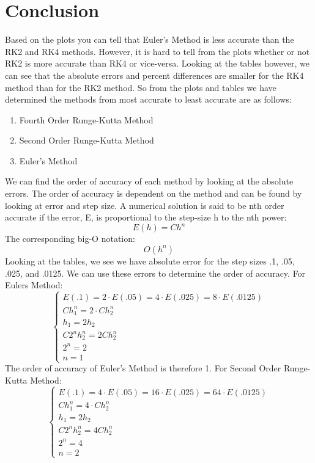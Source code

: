 \documentclass[12pt]{article}
\begin{document}
\section{Conclusion}\label{sec::conclusion}
Based on the plots you can tell that Euler's Method is less accurate than the RK2 and RK4 methods. However, it is hard to tell from the plots whether or not RK2 is more accurate than RK4 or vice-versa. Looking at the tables however, we can see that the absolute errors and percent differences are smaller for the RK4 method than for the RK2 method. So from the plots and tables we have determined the methods from most accurate to least accurate are as follows:
\begin{enumerate}
\item Fourth Order Runge-Kutta Method
\item Second Order Runge-Kutta Method
\item Euler's Method
\end{enumerate}
We can find the order of accuracy of each method by looking at the absolute errors. The order of accuracy is dependent on the method and can be found by looking at error and step size. A numerical solution is said to be nth order accurate if the error, E, is proportional to the step-size h to the nth power:
\begin{equation}
E(h) = Ch^n
\end{equation}
The corresponding big-O notation:
\begin{equation}
O(h^n)
\end{equation}
Looking at the tables, we see we have absolute error for the step sizes .1, .05, .025, and .0125. We can use these errors to determine the order of accuracy. For Eulers Method:
\begin{equation}
\left\{ %
\begin{array}{cccc}
  E(.1) = 2 \cdot E(.05) = 4 \cdot E(.025) = 8 \cdot E(.0125) \\
  Ch_1^n = 2 \cdot C h_2^n \\
  h_1 = 2h_2 \\
  C2^nh_2^n = 2Ch_2^n \\
  2^n = 2 \\
  n = 1
\end{array}
\right. %
\label{eq::curly}
\end{equation}
The order of accuracy of Euler's Method is therefore 1.
For Second Order Runge-Kutta Method:
\begin{equation}
\left\{ %
\begin{array}{cccc}
  E(.1) = 4 \cdot E(.05) = 16 \cdot E(.025) = 64 \cdot E(.0125) \\
  Ch_1^n = 4 \cdot Ch_2^n \\
  h_1 = 2h_2 \\
  C2^nh_2^n = 4Ch_2^n \\
  2^n = 4 \\
  n = 2
\end{array}
\right. %
\label{eq::curly}
\end{equation}
\end{document}
